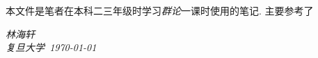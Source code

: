     本文件是笔者在本科二三年级时学习\emph{群论}一课时使用的笔记. 主要参考了\cite{Xu1994}

    \vspace{2cm}
    \begin{flushright}
        \textit{林海轩} \\[1em]
        \textit{复旦大学\ \today}
    \end{flushright}